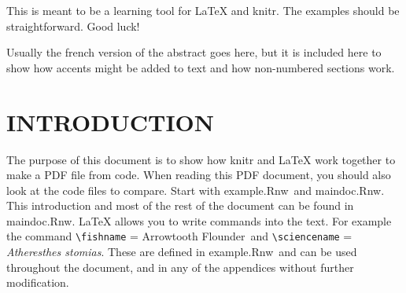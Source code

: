 \documentclass[11pt]{book}\usepackage[]{graphicx}\usepackage[]{color}
\newcommand{\rnwexamplefile}{example.Rnw}
\newcommand{\rnwmaindocfile}{maindoc.Rnw}
\newcommand{\latex}{\LaTeX\xspace}
\newcommand{\fishname}{Arrowtooth Flounder}
\newcommand{\sciencename}{Atheresthes stomias}
\begin{document}


\setcounter{secnumdepth}{5} %

\renewcommand{\thesection}{\arabic{section}}
\renewcommand{\thetable}{\arabic{table}}
\renewcommand{\thefigure}{\arabic{figure}}
\renewcommand{\theequation}{\arabic{equation}}




This is meant to be a learning tool for \latex and knitr. The examples should be straightforward. Good luck!

\newpage


Usually the french version of the abstract goes here, but it is included here to show how accents might be added to text and how non-numbered sections work.

\clearpage

\setcounter{page}{1}

\section{INTRODUCTION}
The purpose of this document is to show how knitr and \latex work together to make a PDF file from code. When reading this PDF document, you should also look at the code files to compare. Start with \rnwexamplefile\ and \rnwmaindocfile. This introduction and most of the rest of the document can be found in \rnwmaindocfile. \latex allows you to write commands into the text. For example the command \verb!\fishname! =  \fishname\ and \verb!\sciencename! = \emph{\sciencename}. These are defined in \rnwexamplefile\ and can be used throughout the document, and in any of the appendices without further modification. \\
\end{document}
